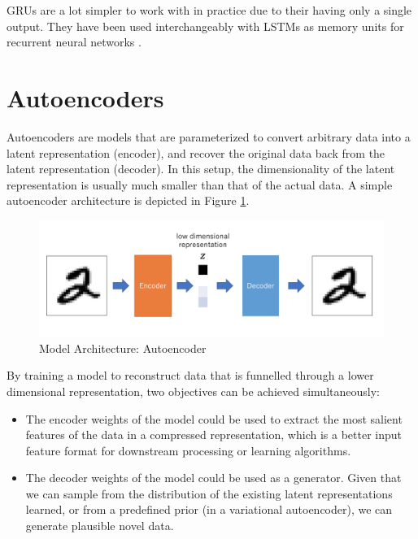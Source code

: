 GRUs are a lot simpler to work with in practice due to their having only a single output. They have been used interchangeably with LSTMs as memory units for recurrent neural networks \citep{chung2015gated,fu2017style}.


\section{Autoencoders}

Autoencoders are models that are parameterized to convert arbitrary data into a latent representation (encoder), and recover the original data back from the latent representation (decoder). In this setup, the dimensionality of the latent representation is usually much smaller than that of the actual data. A simple autoencoder architecture is depicted in Figure \ref{fig:autoencoder-structure}.

\begin{figure}[ht]
	\centering
	\includegraphics[width=\textwidth]{images/autoencoder-structure}
	\caption{\label{fig:autoencoder-structure} Model Architecture: Autoencoder}
\end{figure}

By training a model to reconstruct data that is funnelled through a lower dimensional representation, two objectives can be achieved simultaneously:
\begin{itemize}
	\item The encoder weights of the model could be used to extract the most salient features of the data in a compressed representation, which is a better input feature format for downstream processing or learning algorithms. \citep{hinton2006reducing}
	\item The decoder weights of the model could be used as a generator. Given that we can sample from the distribution of the existing latent representations learned, or from a predefined prior (in a variational autoencoder), we can generate plausible novel data.
\end{itemize}

